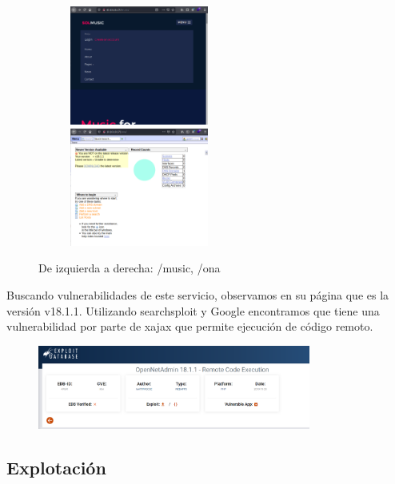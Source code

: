 \documentclass{article}
\begin{document}
\begin{figure}[H]
	\center
	\begin{subfigure}[c]{\linewidth}
	\includegraphics[width=0.5\textwidth]{images/openadmin/4-musicdetalles.png}
	\includegraphics[width=0.5\textwidth]{images/openadmin/5-ona.png}
	\end{subfigure}
	\caption{De izquierda a derecha: /music, /ona}
\end{figure}

Buscando vulnerabilidades de este servicio, observamos en su página que es la versión v18.1.1. Utilizando searchsploit y Google encontramos que tiene una vulnerabilidad por parte de xajax que permite ejecución de código remoto.
\begin{figure}[H]
	\center
	\includegraphics[width=0.8\textwidth]{images/openadmin/6-exploit.png}
	\caption{}
\end{figure}

\subsection{Explotación}
\end{document}
